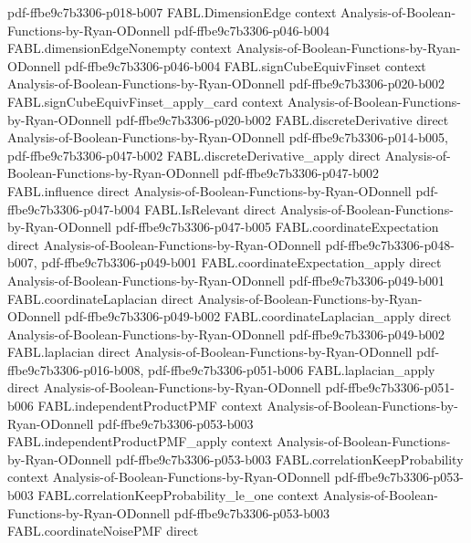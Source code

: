 \begin{theorem}
  {pdf-ffbe9c7b3306-p018-b007}
\proofstep
  {FABL.DimensionEdge}
  {context}
  {Analysis-of-Boolean-Functions-by-Ryan-ODonnell}
  {pdf-ffbe9c7b3306-p046-b004}
\proofstep
  {FABL.dimensionEdgeNonempty}
  {context}
  {Analysis-of-Boolean-Functions-by-Ryan-ODonnell}
  {pdf-ffbe9c7b3306-p046-b004}
\proofstep
  {FABL.signCubeEquivFinset}
  {context}
  {Analysis-of-Boolean-Functions-by-Ryan-ODonnell}
  {pdf-ffbe9c7b3306-p020-b002}
\proofstep
  {FABL.signCubeEquivFinset_apply_card}
  {context}
  {Analysis-of-Boolean-Functions-by-Ryan-ODonnell}
  {pdf-ffbe9c7b3306-p020-b002}
\proofstep
  {FABL.discreteDerivative}
  {direct}
  {Analysis-of-Boolean-Functions-by-Ryan-ODonnell}
  {pdf-ffbe9c7b3306-p014-b005,
    pdf-ffbe9c7b3306-p047-b002}
\proofstep
  {FABL.discreteDerivative_apply}
  {direct}
  {Analysis-of-Boolean-Functions-by-Ryan-ODonnell}
  {pdf-ffbe9c7b3306-p047-b002}
\proofstep
  {FABL.influence}
  {direct}
  {Analysis-of-Boolean-Functions-by-Ryan-ODonnell}
  {pdf-ffbe9c7b3306-p047-b004}
\proofstep
  {FABL.IsRelevant}
  {direct}
  {Analysis-of-Boolean-Functions-by-Ryan-ODonnell}
  {pdf-ffbe9c7b3306-p047-b005}
\proofstep
  {FABL.coordinateExpectation}
  {direct}
  {Analysis-of-Boolean-Functions-by-Ryan-ODonnell}
  {pdf-ffbe9c7b3306-p048-b007,
    pdf-ffbe9c7b3306-p049-b001}
\proofstep
  {FABL.coordinateExpectation_apply}
  {direct}
  {Analysis-of-Boolean-Functions-by-Ryan-ODonnell}
  {pdf-ffbe9c7b3306-p049-b001}
\proofstep
  {FABL.coordinateLaplacian}
  {direct}
  {Analysis-of-Boolean-Functions-by-Ryan-ODonnell}
  {pdf-ffbe9c7b3306-p049-b002}
\proofstep
  {FABL.coordinateLaplacian_apply}
  {direct}
  {Analysis-of-Boolean-Functions-by-Ryan-ODonnell}
  {pdf-ffbe9c7b3306-p049-b002}
\proofstep
  {FABL.laplacian}
  {direct}
  {Analysis-of-Boolean-Functions-by-Ryan-ODonnell}
  {pdf-ffbe9c7b3306-p016-b008,
    pdf-ffbe9c7b3306-p051-b006}
\proofstep
  {FABL.laplacian_apply}
  {direct}
  {Analysis-of-Boolean-Functions-by-Ryan-ODonnell}
  {pdf-ffbe9c7b3306-p051-b006}
\proofstep
  {FABL.independentProductPMF}
  {context}
  {Analysis-of-Boolean-Functions-by-Ryan-ODonnell}
  {pdf-ffbe9c7b3306-p053-b003}
\proofstep
  {FABL.independentProductPMF_apply}
  {context}
  {Analysis-of-Boolean-Functions-by-Ryan-ODonnell}
  {pdf-ffbe9c7b3306-p053-b003}
\proofstep
  {FABL.correlationKeepProbability}
  {context}
  {Analysis-of-Boolean-Functions-by-Ryan-ODonnell}
  {pdf-ffbe9c7b3306-p053-b003}
\proofstep
  {FABL.correlationKeepProbability_le_one}
  {context}
  {Analysis-of-Boolean-Functions-by-Ryan-ODonnell}
  {pdf-ffbe9c7b3306-p053-b003}
\proofstep
  {FABL.coordinateNoisePMF}
  {direct}

\end{theorem}
